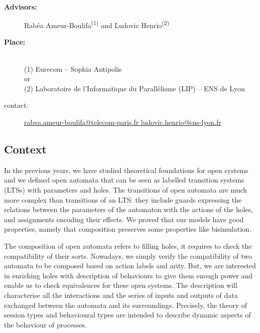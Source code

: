 \documentclass[11pt,fleqn]{article}
\begin{document}
\begin{center}
\\\bigskip
{}
\end{center}
\medskip

\begin{description}
\item[\bf Advisors:] Rabéa Ameur-Boulifa\textsuperscript{(1)} and Ludovic Henrio\textsuperscript{(2)}
\item[\bf Place:] ~\\(1) Eurecom  -- Sophia Antipolis
\\
or\\
(2) Laboratoire de l'Informatique du Parallélisme (LIP) --
  ENS de Lyon

\item[contact:]  \quad \url{rabea.ameur-boulifa@telecom-paris.fr }  \quad \qquad \url{ludovic.henrio@ens-lyon.fr}
\end{description}

\subsection*{Context}




In the previous years, we have studied theoretical foundations for open
systems and we defined  open automata \cite{arxiv-weakbisim,henrio:Forte2016,hou:hal-02406098} that can be seen as labelled transition systems (LTSs) with parameters and holes. The transitions of open
automata are much more complex than transitions of an LTS: they include guards expressing the relations between the parameters of the automaton with the actions of the holes, and assignments encoding their effects.
 We proved that our models 
have good properties, namely that composition preserves some properties like bisimulation.



The composition of open automata refers to filling holes, it requires to check the compatibility of their sorts. Nowadays, we simply verify the compatibility of two automata to be composed based on   action labels and  arity. But, 
 we are interested in enriching holes with description of behaviours to give them enough power and enable us to check equivalences for these open systems. The description will characterise all the
interactions and the series of inputs and outputs of data exchanged between the automata and its surroundings. Precisely, the theory of session types and behavioural types  \cite{Fantechi:MLTCDP2019} are intended  to describe dynamic aspects of the behaviour of processes.
\end{document}
